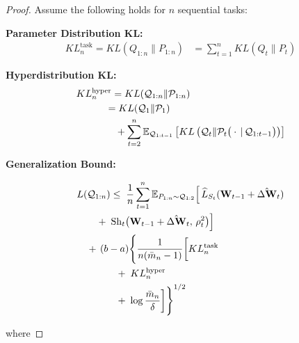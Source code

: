\documentclass[letterpaper]{article} %
\begin{document}
\begin{proof}
Assume the following holds for $n$ sequential tasks:


\textbf{Parameter Distribution KL:}
    \begin{align}
     KL^{\text{task}}_n=KL(Q_{1:n} \| P_{1:n}) 
    &= \sum_{t=1}^n KL(Q_t \| P_t)
    \end{align}

 
\textbf{Hyperdistribution KL:}
    \begin{align}
    &KL^{\text{hyper}}_n =KL(\mathcal{Q}_{1:n} \| \mathcal{P}_{1:n}) \notag \\
    & \quad  \qquad= KL(\mathcal{Q}_1 \| \mathcal{P}_1) \notag  \\
      & \qquad \qquad + \sum_{t=2}^n 
        \mathbb{E}_{\mathcal{Q}_{1:t-1}} \left[ 
            KL\left(\mathcal{Q}_t \| \mathcal{P}_t\big(\cdot\,|\,\mathcal{Q}_{1:t-1}\big)\right) 
        \right]
    \end{align}

\textbf{Generalization Bound:}

\begin{align}
& L(\mathcal{Q}_{1:n}) \leq\;  \frac{1}{n} \sum_{t=1}^n 
    \mathbb{E}_{P_{1:n} \sim \mathcal{Q}_{1:2}} 
    \Big[\, 
        \widehat{L}_{S_t}(\mathbf{W}_{t-1} + \hat{\Delta\mathbf{W}}_t) \notag \\
&\qquad
    +\; \mathrm{Sh}_t\big(\mathbf{W}_{t-1} + \hat{\Delta\mathbf{W}}_t,\, \rho_t^2\big)
    \Big] \notag \\
&\quad
    +\, (b-a)\Bigg\{ \frac{1}{n(\bar{m}_n - 1)} \bigg[
            KL^{\text{task}}_n \notag \\
&\qquad\qquad
            +\; KL^{\text{hyper}}_n \notag \\
&\qquad\qquad
            +\; \log\frac{\bar{m}_n}{\delta}
        \bigg] \Bigg\}^{1/2}
\end{align}

    
    where



\end{proof}
\end{document}

